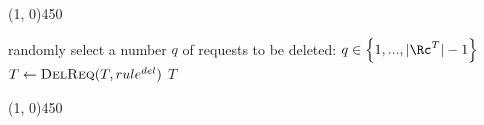 
	\line(1, 0){450}
%	
	\begin{algorithmic}[1]
			\State randomly select a number $q$ of requests to be deleted: $q \in \left\lbrace 1,...,|\Rc^T|-1\right\rbrace$ 
				\State $T \leftarrow \textsc{DelReq}(T, rule^{del})$
			\EndFor
			\State 	\Return $T$
			
		\EndProcedure
	\end{algorithmic}
	\line(1, 0){450}
	
	
	